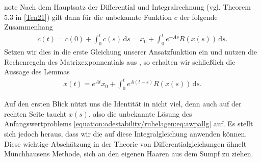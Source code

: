 \documentclass[letterpaper,10pt,english]{jupyterBook}
\begin{document}
\begin{sphinxadmonition}{note}
\sphinxAtStartPar
Nach dem Hauptsatz der Differential\sphinxhyphen{} und Integralrechnung (vgl. Theorem 5.3 in {[}\hyperlink{cite.references:id12}{Ten21}{]}) gilt dann für die unbekannte Funktion \(c\) der folgende Zusammenhang
\begin{equation*}
\begin{split}c(t) = c(0) + \int_0^t \dot{c}(s)\, \mathrm{d}s = x_0+ \int_0^t e^{-As}R(x(s)) \, \mathrm{d}s.\end{split}
\end{equation*}
\sphinxAtStartPar
Setzen wir dies in die erste Gleichung unserer Ansatzfunktion ein und nutzen die Rechenregeln des Matrixexponnentials aus {\hyperref[\detokenize{ode/repetition:rem:matrixexponentialregeln}]{}}, so erhalten wir schließlich die Aussage des Lemmas
\begin{equation*}
\begin{split}x(t) = e^{At}x_0+ \int_0^t e^{A(t-s)}R(x(s)) \, \mathrm{d}s.\end{split}
\end{equation*}\end{sphinxadmonition}

\sphinxAtStartPar
Auf den ersten Blick nützt uns die Identität in {\hyperref[\detokenize{odestability/ruhelagen:lem:intexpglgn}]{}} nicht viel, denn auch auf der rechten Seite taucht \(x(s)\), also die unbekannte Lösung des Anfangswertproblems \eqref{equation:odestability/ruhelagen:eq:awpallg} auf.
Es stellt sich jedoch heraus, dass wir die  auf diese Integralgleichung anwenden können.
Diese wichtige Abschätzung in der Theorie von Differentialgleichungen ähnelt Münchhausens Methode, sich an den eigenen Haaren aus dem Sumpf zu ziehen.
\end{document}
